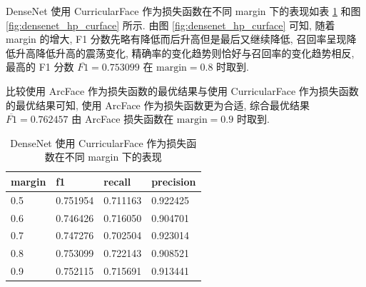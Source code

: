 \documentclass[12pt]{article}
\begin{document}
DenseNet 使用 CurricularFace 作为损失函数在不同 margin 下的表现如表 \ref{tab:densenet_hp_curface} 和图 \ref{fig:densenet_hp_curface} 所示. 由图 \ref{fig:densenet_hp_curface} 可知, 随着 margin 的增大, F1 分数先略有降低而后升高但是最后又继续降低, 召回率呈现降低升高降低升高的震荡变化, 精确率的变化趋势则恰好与召回率的变化趋势相反, 最高的 F1 分数 $\overline{F1}=0.753099$ 在 $\text{margin} = 0.8$ 时取到.

比较使用 ArcFace 作为损失函数的最优结果与使用 CurricularFace 作为损失函数的最优结果可知, 使用 ArcFace 作为损失函数更为合适, 综合最优结果 $\overline{F1}=0.762457$ 由 ArcFace 损失函数在 $\text{margin} = 0.9$ 时取到.

\begin{table}[htbp]
  \centering
  \caption{DenseNet 使用 CurricularFace 作为损失函数在不同 margin 下的表现}
  \label{tab:densenet_hp_curface}
  \begin{tabular}{llll}
    \toprule
    margin & f1       & recall   & precision \\
    \midrule
    0.5 & 0.751954 & 0.711163 & 0.922425  \\
    0.6 & 0.746426 & 0.716050 & 0.904701  \\
    0.7 & 0.747276 & 0.702504 & 0.923014  \\
    0.8 & 0.753099 & 0.722143 & 0.908521  \\
    0.9 & 0.752115 & 0.715691 & 0.913441  \\
    \bottomrule
  \end{tabular}
\end{table}
\end{document}
